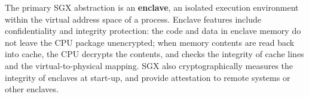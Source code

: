 The primary SGX abstraction is an {\bf enclave}, an isolated execution environment within the virtual address space of a process.
Enclave features include confidentiality and integrity protection:
the code and data in enclave memory do not leave the CPU
package unencrypted; when memory contents are read back into cache,
the CPU decrypts the contents, and checks the integrity of cache lines and the virtual-to-physical mapping.
SGX also cryptographically measures the integrity of enclaves at start-up, and 
provide attestation to remote systems or other enclaves.










